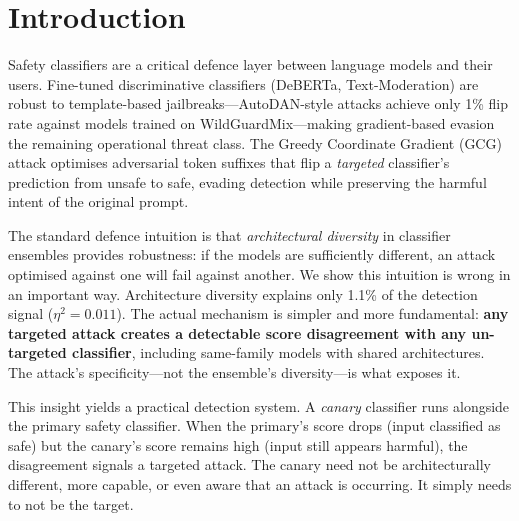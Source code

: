 \documentclass{article}
\begin{document}
\section{Introduction}
\label{sec:intro}

Safety classifiers are a critical defence layer between language models and their users. Fine-tuned discriminative classifiers (DeBERTa, Text-Moderation) are robust to template-based jailbreaks---AutoDAN-style attacks achieve only 1\% flip rate against models trained on WildGuardMix---making gradient-based evasion~\citep{zou2023universal} the remaining operational threat class. The Greedy Coordinate Gradient (GCG) attack optimises adversarial token suffixes that flip a \emph{targeted} classifier's prediction from unsafe to safe, evading detection while preserving the harmful intent of the original prompt.

The standard defence intuition is that \emph{architectural diversity} in classifier ensembles provides robustness: if the models are sufficiently different, an attack optimised against one will fail against another. We show this intuition is wrong in an important way. Architecture diversity explains only 1.1\% of the detection signal ($\eta^2 = 0.011$). The actual mechanism is simpler and more fundamental: \textbf{any targeted attack creates a detectable score disagreement with any un-targeted classifier}, including same-family models with shared architectures. The attack's specificity---not the ensemble's diversity---is what exposes it.

This insight yields a practical detection system. A \emph{canary} classifier runs alongside the primary safety classifier. When the primary's score drops (input classified as safe) but the canary's score remains high (input still appears harmful), the disagreement signals a targeted attack. The canary need not be architecturally different, more capable, or even aware that an attack is occurring. It simply needs to not be the target.
\end{document}
